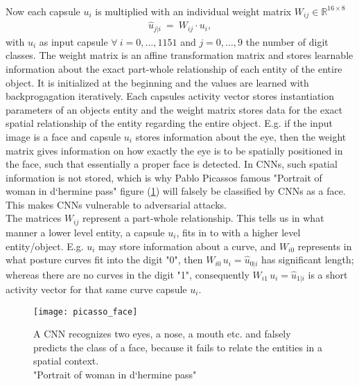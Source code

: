 \documentclass{article}
\begin{document}
{\\
Now each capsule $u_i$ is multiplied with an individual weight matrix $W_{ij} \in \mathbb{R}^{16 \times 8}$
\begin{align} \label{u_hat}
\hat{u}_{j|i} \ = \ W_{ij} \cdot u_i,
\end{align}
with $u_i$ as input capsule $\forall \ i=0, \ldots, 1151$ and $j = 0, \ldots , 9$ the number of digit classes. 
The weight matrix is an affine transformation matrix and stores learnable information about the exact part-whole relationship of each entity of the entire object. It is initialized at the beginning and the values are learned with backprogagation iteratively. Each capsules activity vector stores instantiation parameters of an objects entity and the weight matrix stores data for the exact spatial relationship of the entity regarding the entire object. E.g. if the input image is a face and capsule $u_i$ stores information about the eye, then the weight matrix gives information on how exactly the eye is to be spatially positioned in the face, such that essentially a proper face is detected. In CNNs, such spatial information is not stored, which is why Pablo Picassos famous "Portrait of woman in d`hermine pass" figure (\ref{picasso_face}) will falsely be classified by CNNs as a face. This makes CNNs vulnerable to adversarial attacks.\\
The matrices $W_{ij}$ represent a part-whole relationship. This tells us in what manner a lower level entity, a capsule $u_i$, fits in to with a higher level entity/object. E.g. $u_i$ may store information about a curve, and $W_{i0}$ represents in what posture curves fit into the digit "0", then $W_{i0} \, u_i = \hat{u}_{0|i}$ has significant length; whereas there are no curves in the digit "1", consequently $W_{i1} \, u_i = \hat{u}_{1|i}$ is a short activity vector for that same curve capsule $u_i$.

\begin{figure}[!htb]
\vskip 0.2in
\begin{center}
\centerline{\texttt{[image: picasso\_face]}}
\caption{A CNN recognizes two eyes, a nose, a mouth etc. and falsely predicts the class of a face, because it fails to relate the entities in a spatial context. \\ "Portrait of woman in d`hermine pass"\cite{picasso_face}\label{picasso_face}}
\end{center}
\vskip -0.2in
\end{figure}

}
\end{document}
